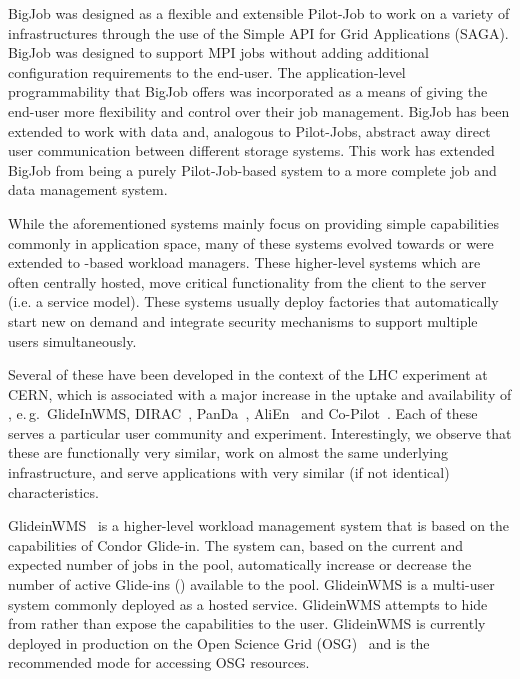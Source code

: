 \documentclass{sig-alternate}
\begin{document}
BigJob was designed as a flexible and extensible Pilot-Job to work on a variety
of infrastructures through the use of the Simple API for Grid Applications
(SAGA).
BigJob was designed to support MPI jobs without adding additional configuration
requirements to the end-user.
The application-level programmability that BigJob offers was incorporated as a
means of giving the end-user more flexibility and control over their job
management.
BigJob has been extended to work with data and, analogous to Pilot-Jobs,
abstract away direct user communication between different storage systems.
This work has extended BigJob from being a purely Pilot-Job-based system to a
more complete job and data management system.


While the aforementioned systems mainly focus on providing simple
\pilot capabilities commonly in application space, many of these systems
evolved towards or were extended to \pilot-based workload managers.
These higher-level systems which are often centrally hosted, move critical
functionality from the client to the server (i.e. a service model).
These systems usually deploy \pilot factories that automatically start new
\pilots on demand and integrate security mechanisms to support multiple users
simultaneously.

Several of these have been developed in the context of the LHC
experiment at CERN, which is associated with a major increase in the
uptake and availability of \pilots, e.\,g.\ GlideInWMS,
DIRAC~\cite{1742-6596-219-6-062049},
PanDa~\cite{1742-6596-331-7-072069},
AliEn~\cite{1742-6596-119-6-062012} and Co-Pilot~\cite{copilot-tr}.
Each of these \pilots serves a particular user community and
experiment. Interestingly, we observe that these \pilots are
functionally very similar, work on almost the same underlying
infrastructure, and serve applications with very similar (if not
identical) characteristics.

GlideinWMS~\cite{1742-6596-119-6-062044} is a higher-level workload management
system that is based on the \pilot capabilities of Condor Glide-in.
The system can, based on the current and expected number of jobs in the pool,
automatically increase or decrease the number of active Glide-ins (\pilots)
available to the pool.
GlideinWMS is a multi-user \pilotjob system commonly deployed as a hosted
service.
GlideinWMS attempts to hide from rather than expose the \pilot capabilities to
the user.
GlideinWMS is currently deployed in production on the Open Science Grid
(OSG)~\cite{url_osg} and is the recommended mode for accessing OSG resources.
\end{document}
